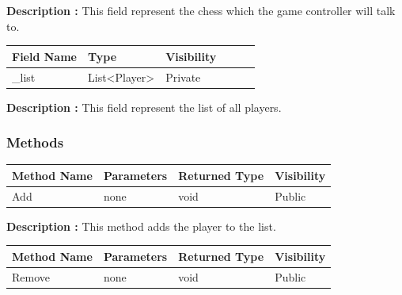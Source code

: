 \documentclass[12pt]{article}
\begin{document}
\textbf{Description :} This field represent the chess which the game controller will talk to.

\begin{table}[H]
    \begin{tabular}{llllll}
    \hline
    \multicolumn{1}{|l|}{\cellcolor[HTML]{EFEFEF}\textbf{Field Name}} & \multicolumn{1}{l|}{\cellcolor[HTML]{EFEFEF}\textbf{Type}} & \multicolumn{1}{l|}{\cellcolor[HTML]{EFEFEF}\textbf{Visibility}} \\ \hline
    \multicolumn{1}{|l|}{\_list}                                      & \multicolumn{1}{l|}{List\textless{}Player\textgreater{}}                                 & \multicolumn{1}{l|}{Private}                                     \\ \hline
    \end{tabular}
\end{table}

\textbf{Description :} This field represent the list of all players.

\subsubsection{Methods}

\begin{table}[H]
    \begin{tabular}{|l|l|l|l|}
    \hline
    \rowcolor[HTML]{EFEFEF} 
    \cellcolor[HTML]{EFEFEF}\textbf{Method Name} & \textbf{Parameters}    & \textbf{Returned Type} & \textbf{Visibility} \\ \hline
    Add                                          & none                   & void                   & Public             \\ \hline
    \end{tabular}
\end{table}

\textbf{Description :} This method adds the player to the list.

\begin{table}[H]
    \begin{tabular}{|l|l|l|l|}
    \hline
    \rowcolor[HTML]{EFEFEF} 
    \cellcolor[HTML]{EFEFEF}\textbf{Method Name} & \textbf{Parameters}    & \textbf{Returned Type} & \textbf{Visibility} \\ \hline
    Remove                                       & none                   & void                   & Public             \\ \hline
    \end{tabular}
\end{table}
\end{document}
